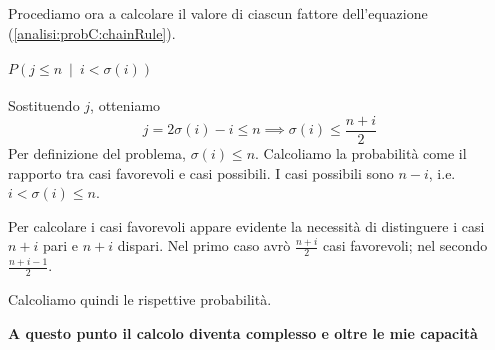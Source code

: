 \documentclass[../../main.tex]{subfiles}
\begin{document}
Procediamo ora a calcolare il valore di ciascun fattore dell'equazione (\ref{analisi:probC:chainRule}).
\paragraph{$P(j \leq n\ \mid\ i < \sigma(i))$}
Sostituendo $j$, otteniamo
$$j = 2\sigma(i) - i \leq n \implies \sigma(i) \leq \frac{n+i}{2}$$
Per definizione del problema, $\sigma(i) \leq n$.
Calcoliamo la probabilità come il rapporto tra casi favorevoli e casi possibili.
I casi possibili sono $n-i$, i.e. $i < \sigma(i) \leq n$.

Per calcolare i casi favorevoli appare evidente la necessità di distinguere i casi $n+i$ pari e $n+i$ dispari.
Nel primo caso avrò $\frac{n+i}{2}$ casi favorevoli; nel secondo $\frac{n+i-1}{2}$.

Calcoliamo quindi le rispettive probabilità.

\dotfill

{\large\textbf{A questo punto il calcolo diventa complesso e oltre le mie capacità}}

\dotfill
\end{document}
